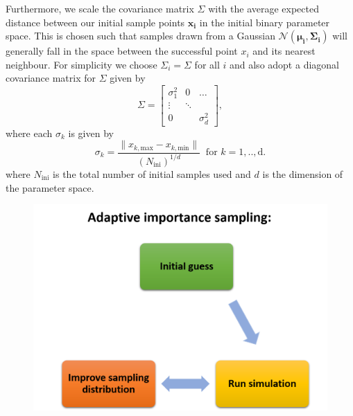 \documentclass[a4paper,fleqn,usenatbib]{mnras}
\begin{document}
\begin{itemize}
Furthermore, we scale the covariance matrix $\Sigma$  with the average expected distance between our initial sample points $ \mathbf{x_i}$ in the initial binary parameter space. This is chosen such that samples drawn from a Gaussian $\mathcal{N}({\boldsymbol {\mu _{i},\Sigma _{i}}})$  will generally fall in the space between the successful point  $x_i$ and its nearest neighbour.  For simplicity we choose $\Sigma_i = \Sigma$ for all $i$ and also adopt a diagonal covariance matrix for $\Sigma$ given by 
%
\begin{equation}
\Sigma = \begin{bmatrix} 
    \sigma_{1}^2 & 0 & \dots \\
    \vdots & \ddots & \\
    0 &        & \sigma_{d}^2 
    \end{bmatrix}, 
	\label{eq:covariance-matrix}
\end{equation}
%
where each $\sigma_k $  is given by
%
\begin{equation}
\sigma_k =  \frac{\|x_{k, \text{max}} - x_{k, \text{min}}\|}{(N_{\text{ini}})^{1/d}} \  \text{ for } k = 1,.. ,\text{d}.
	\label{eq:sigma-covariance-matrix}
\end{equation}
%
where $N_{\text{ini}}$ is the total number of initial samples used and $d$ is the dimension of the parameter space. 
\end{itemize}


\begin{figure}
	\includegraphics[width=\columnwidth]{aIS_scheme.png}
    \caption{ }
    \label{fig:aIS_scheme}
\end{figure}
\end{document}
